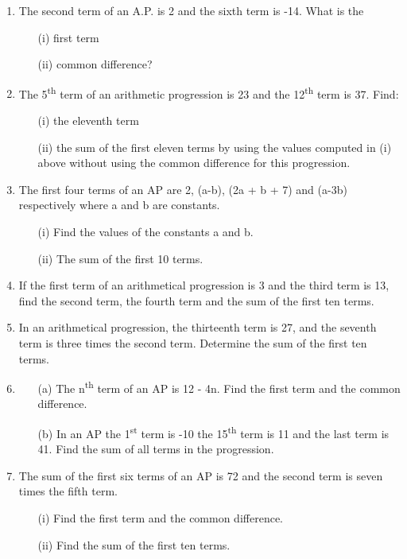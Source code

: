 \begin{enumerate}
	\item The second term of an A.P. is 2 and the sixth term is -14. What is the
	\begin{itemize}
	\item[(i)] first term
	\item[(ii)] common difference?
	\end{itemize}
	
		
	\item The 5\textsuperscript{th} term of an arithmetic progression is 23 and the 12\textsuperscript{th} term is 37. Find:
	\begin{itemize}
	\item[(i)] the eleventh term
	\item[(ii)] the sum of the first eleven terms by using the values computed in (i) above without using the common difference for this progression.
	\end{itemize}
	
	\item The first four terms of an AP are 2, (a-b), (2a + b + 7) and (a-3b) respectively where a and b are constants.
	\begin{itemize}
	\item[(i)] Find the values of the constants a and b.
	\item[(ii)] The sum of the first 10 terms.
	\end{itemize}
	
	\item If the first term of an arithmetical progression is 3 and the third term is 13, find the second term, the fourth term and the sum of the first ten terms.
	
	\item In an arithmetical progression, the thirteenth term is 27, and the seventh term is three times the second term. Determine the sum of the first ten terms.
	
	\item 
	\begin{itemize}
	\item[(a)] The n\textsuperscript{th} term of an AP is 12 - 4n. Find the first term and the common difference.
	\item[(b)] In an AP the 1\textsuperscript{st} term is -10 the 15\textsuperscript{th} term is 11 and the last term is 41. Find the sum of all terms in the progression.
	\end{itemize}
	
	\item The sum of the first six terms of an AP is 72 and the second term is seven times the fifth term.
	\begin{itemize}
	\item[(i)] Find the first term and the common difference.
	\item[(ii)] Find the sum of the first ten terms.
	\end{itemize}
	

\end{enumerate}
